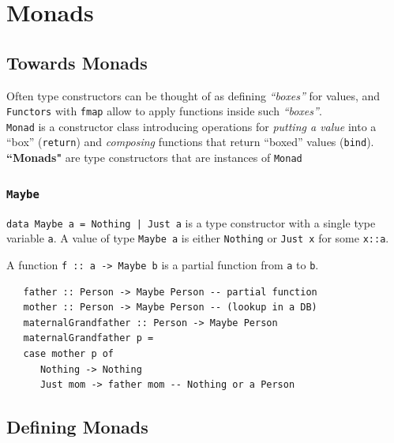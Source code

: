 \chapter{Monads}


\section{Towards Monads}
Often type constructors can be thought of as
defining \textit{``boxes''} for values, and \lstinline|Functors| with \lstinline|fmap| allow to apply functions
inside such \textit{``boxes''}.\\
\lstinline|Monad| is a constructor class introducing
operations for \textit{putting a value} into a ``box'' (\lstinline|return|) and \textit{composing} functions that return ``boxed'' values (\lstinline|bind|).\\
\textbf{``Monads"} are type constructors that are instances of \lstinline|Monad|


\subsection{\texttt{Maybe}}
\lstinline{data Maybe a = Nothing | Just a} is a type constructor with a single type variable \lstinline|a|.
A value of type \lstinline|Maybe a| is either \lstinline|Nothing| or \lstinline|Just x| for some \lstinline|x::a|.

A function \lstinline|f :: a -> Maybe b| is a partial function from
\lstinline|a| to \lstinline|b|.
\begin{lstlisting}
   father :: Person -> Maybe Person -- partial function
   mother :: Person -> Maybe Person -- (lookup in a DB)
   maternalGrandfather :: Person -> Maybe Person
   maternalGrandfather p =
   case mother p of
      Nothing -> Nothing
      Just mom -> father mom -- Nothing or a Person
\end{lstlisting}

\section{Defining Monads}




